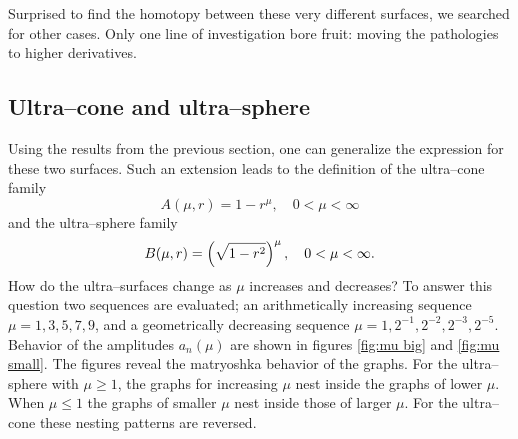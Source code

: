 \documentclass[preprint,12pt]{elsarticle}
\begin{document}
Surprised to find the homotopy between these very different surfaces, we searched for other cases. Only one line of investigation bore fruit: moving the pathologies to higher derivatives.

\subsection{Ultra--cone and ultra--sphere}
Using the results from the previous section, one can generalize the expression for these two surfaces. Such an extension leads to the definition of the ultra--cone family
\begin{equation}
  A(\mu,r) = 1-r^{\mu}, \quad 0<\mu<\infty
  \label{eq:mu:cone}
\end{equation}
and the ultra--sphere family
\begin{equation}
  B(\mu,r) = \left( \sqrt{1-r^{2}} \right)^{\mu}, \quad 0<\mu<\infty.
  \label{eq:mu:sphere}
\end{equation}
How do the ultra--surfaces change as $\mu$ increases and decreases? To answer this question two sequences are evaluated; an arithmetically increasing sequence $\mu={1,3,5,7,9}$, and a geometrically decreasing sequence $\mu={1,2^{-1},2^{-2},2^{-3},2^{-5}}$. Behavior of the amplitudes $a_{n}(\mu)$ are shown in figures \ref{fig:mu big} and \ref{fig:mu small}. The figures reveal the matryoshka behavior of the graphs. For the ultra--sphere with $\mu\ge1$, the graphs for increasing $\mu$ nest inside the graphs of lower $\mu$. When $\mu \le1$ the graphs of smaller $\mu$ nest inside those of larger $\mu$. For the ultra--cone these nesting patterns are reversed.
\end{document}
